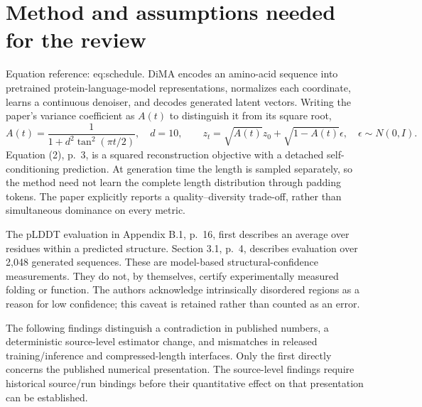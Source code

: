 \documentclass[10pt]{article}
\begin{document}
\section*{Method and assumptions needed for the review}
Equation reference: eq:schedule. DiMA encodes an amino-acid sequence into pretrained protein-language-model representations, normalizes each coordinate, learns a continuous denoiser, and decodes generated latent vectors. Writing the paper’s variance coefficient as \(A(t)\) to distinguish it from its square root, \[A(t)=\frac{1}{1+d^2\tan^2(\pi t/2)},\quad d=10,\qquad
 z_t=\sqrt{A(t)}z_0+\sqrt{1-A(t)}\epsilon,\quad \epsilon\sim N(0,I).
 \] Equation (2), p. 3, is a squared reconstruction objective with a detached self-conditioning prediction. At generation time the length is sampled separately, so the method need not learn the complete length distribution through padding tokens. The paper explicitly reports a quality–diversity trade-off, rather than simultaneous dominance on every metric.\par
The pLDDT evaluation in Appendix B.1, p. 16, first describes an average over residues within a predicted structure. Section 3.1, p. 4, describes evaluation over 2,048 generated sequences. These are model-based structural-confidence measurements. They do not, by themselves, certify experimentally measured folding or function. The authors acknowledge intrinsically disordered regions as a reason for low confidence; this caveat is retained rather than counted as an error.\par
The following findings distinguish a contradiction in published numbers, a deterministic source-level estimator change, and mismatches in released training/inference and compressed-length interfaces. Only the first directly concerns the published numerical presentation. The source-level findings require historical source/run bindings before their quantitative effect on that presentation can be established.\par
\end{document}
